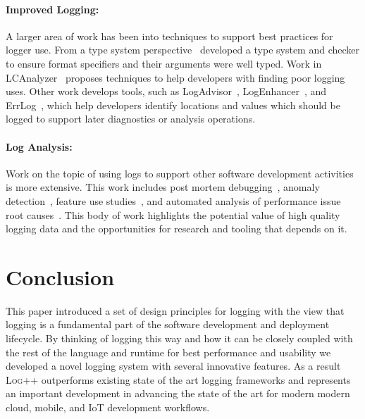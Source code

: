 \documentclass[sigplan,10pt,screen]{acmart}
\newcommand{\projn}{\textsc{Log++}\xspace}
\begin{document}
\paragraph{Improved Logging:}
\noindent
A larger area of work has been into techniques to support best practices for 
logger use. From a type system perspective~\cite{tyepcheckprintf} developed 
a type system and checker to ensure format specifiers and their arguments were 
well typed. Work in LCAnalyzer~\cite{logginganti} proposes 
techniques to help developers with finding poor logging 
uses. Other work develops tools, such as  LogAdvisor~\cite{learnlog}, LogEnhancer~\cite{LogEnhancer}, 
and ErrLog~\cite{ErrLog}, which help developers identify locations and values which should 
be logged to support later diagnostics or analysis operations.

\paragraph{Log Analysis:}
\noindent
Work on the topic of using logs to support other software development activities is 
more extensive. This work includes post mortem debugging~\cite{loganalysis,sherlog,autolog}, anomaly 
detection~\cite{detection}, feature use studies~\cite{twitter}, and automated analysis of performance 
issue root causes~\cite{performance}. 
This body of work highlights the potential value of high quality logging data and the 
opportunities for research and tooling that depends on it.

\section{Conclusion}
This paper introduced a set of design principles for logging with the view that 
logging is a fundamental part of the software development and deployment lifecycle. 
By thinking of logging this way and how it can be closely coupled with the rest of the 
language and runtime for best performance and usability we developed a novel logging 
system with several innovative features. 
As a result \projn outperforms existing state of the art logging frameworks and 
represents an important development in advancing the state of the art for 
modern modern cloud, mobile, and IoT development workflows.
\end{document}
